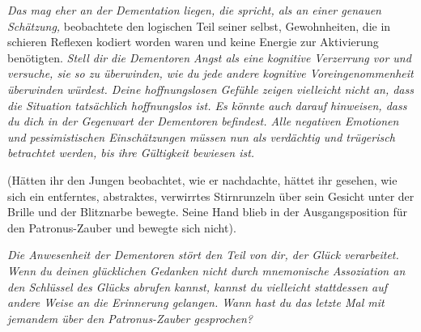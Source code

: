 \emph{Das mag eher an der Dementation liegen, die spricht, als an einer genauen Schätzung,} beobachtete den logischen Teil seiner selbst, Gewohnheiten, die in schieren Reflexen kodiert worden waren und keine Energie zur Aktivierung benötigten. \emph{Stell dir die Dementoren Angst als eine kognitive Verzerrung vor und versuche, sie so zu überwinden, wie du jede andere kognitive Voreingenommenheit überwinden würdest. Deine hoffnungslosen Gefühle zeigen vielleicht nicht an, dass die Situation tatsächlich hoffnungslos ist. Es könnte auch darauf hinweisen, dass du dich in der Gegenwart der Dementoren befindest. Alle negativen Emotionen und pessimistischen Einschätzungen müssen nun als verdächtig und trügerisch betrachtet werden, bis ihre Gültigkeit bewiesen ist.}

(Hätten ihr den Jungen beobachtet, wie er nachdachte, hättet ihr gesehen, wie sich ein entferntes, abstraktes, verwirrtes Stirnrunzeln über sein Gesicht unter der Brille und der Blitznarbe bewegte. Seine Hand blieb in der Ausgangsposition für den Patronus-Zauber und bewegte sich nicht).

\emph{Die Anwesenheit der Dementoren stört den Teil von dir, der Glück verarbeitet. Wenn du deinen glücklichen Gedanken nicht durch mnemonische Assoziation an den Schlüssel des Glücks abrufen kannst, kannst du vielleicht stattdessen auf andere Weise an die Erinnerung gelangen. Wann hast du das letzte Mal mit jemandem über den Patronus-Zauber gesprochen?}

